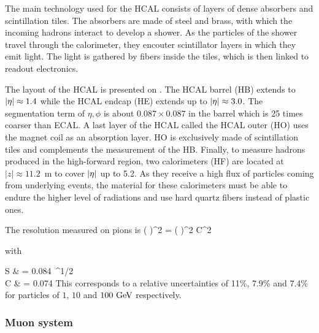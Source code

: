         The main technology used for the HCAL consists of layers of dense absorbers and
        scintillation tiles. The absorbers are made of steel and brass, with which
        the incoming hadrons interact to develop a shower. As the particles of the shower
        travel through the calorimeter, they encouter scintillator layers in which they
        emit light. The light is gathered by fibers inside the tiles, which is then
        linked to readout electronics.


        The layout of the HCAL is presented on . The HCAL barrel
        (HB) extends to $\left| \eta \right| \approx 1.4$ while the HCAL endcap (HE) extends up to
        $\left| \eta \right| \approx 3.0$. The segmentation term of $\eta,\phi$ is about $0.087 \times 0.087$
        in the barrel which is 25 times coarser than ECAL. A last layer of the HCAL called
        the HCAL outer (HO) uses the magnet coil as an absorption layer. HO is exclusively
        made of scintillation tiles and complements the measurement of the HB. Finally, to
        measure hadrons produced in the high-forward region, two calorimeters (HF) are located at
        $\left|z\right| \approx 11.2$~m to cover $\left| \eta \right|$ up to 5.2. As they receive a high flux of
        particles coming from underlying events, the material for these calorimeters must
        be able to endure the higher level of radiations and use hard quartz fibers instead of
        plastic ones.

        The resolution measured on pions is
        {
            \left(  \right)^2
            =
            \left(  \right)^2
            \oplus
            C^2
        }

        with

        {
            S & = 0.084~^{1/2} \\
            C & = 0.074\nonumber
        }
        This corresponds to a relative uncertainties of 11\%, 7.9\% and 7.4\% for particles
        of $1$, $10$ and $100~\text{GeV}$ respectively.

            \subsubsection{Muon system}

